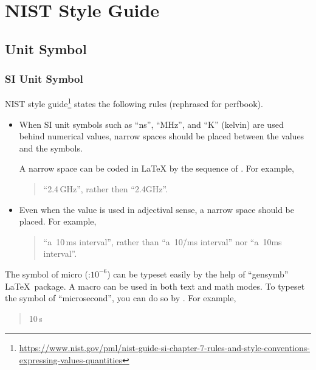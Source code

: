 \section{NIST Style Guide}
\label{sec:app:styleguide:NIST Style Guide}

\subsection{Unit Symbol}
\label{sec:app:styleguide:Unit Symbol}

\subsubsection{SI Unit Symbol}
\label{sec:app:styleguide:SI Unit Symbol}

NIST style guide\footnote{
  \url{https://www.nist.gov/pml/nist-guide-si-chapter-7-rules-and-style-conventions-expressing-values-quantities}}
states the following rules (rephrased for perfbook).

\begin{itemize}
\item When SI unit symbols such as ``ns'', ``MHz'', and ``K'' (kelvin)
are used behind numerical values, narrow spaces should be placed between
the values and the symbols.

A narrow space can be coded in \LaTeX{} by the sequence of
\qco{\\,}.
For example,
\begin{quote}
  ``2.4\,GHz'', rather then ``2.4GHz''.
\end{quote}

\item Even when the value is used in adjectival sense, a narrow space
should be placed. For example,
\begin{quote}
  ``a~10\,ms interval'', rather than ``a~10\=/ms interval'' nor
  ``a~10ms interval''.
\end{quote}
\end{itemize}

The symbol of micro (\micro :$10^{-6}$) can be typeset easily by
the help of ``gensymb'' \LaTeX\ package.
A macro \qco{\\micro} can be used in both text and
math modes. To typeset the symbol of ``microsecond'', you can do
so by . For example,
\begin{quote}
  10\,\micro s
\end{quote}

